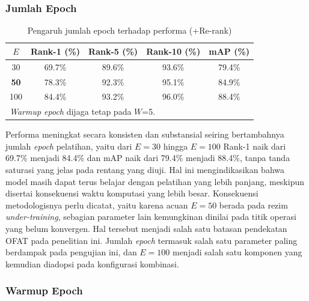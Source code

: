 \subsubsection{Jumlah Epoch}

\begin{table}[H]
    \centering
    \caption{Pengaruh jumlah epoch terhadap performa (+Re-rank)}
    \label{tab:var_epoch}
    \renewcommand{\arraystretch}{1.25}
    \begin{tabular}{ccccc}
        \hline
        $E$         & \textbf{Rank-1 (\%)} & \textbf{Rank-5 (\%)} & \textbf{Rank-10 (\%)} & \textbf{mAP (\%)} \\
        \hline
        30          & 69.7\%               & 89.6\%               & 93.6\%                & 79.4\%            \\
        \textbf{50} & 78.3\%               & 92.3\%               & 95.1\%                & 84.9\%            \\
        100         & 84.4\%               & 93.2\%               & 96.0\%                & 88.4\%            \\
        \hline
        \multicolumn{5}{l}{\footnotesize \textit{Warmup epoch} dijaga tetap pada $W$=5.}                      \\
    \end{tabular}
\end{table}

Performa meningkat secara konsisten dan substansial seiring bertambahnya jumlah \textit{epoch} pelatihan, yaitu dari $E=30$ hingga $E=100$ Rank-1 naik dari 69.7\% menjadi 84.4\% dan mAP naik dari 79.4\% menjadi 88.4\%, tanpa tanda saturasi yang jelas pada rentang yang diuji. Hal ini mengindikasikan bahwa model masih dapat terus belajar dengan pelatihan yang lebih panjang, meskipun disertai konsekuensi waktu komputasi yang lebih besar. Konsekuensi metodologisnya perlu dicatat, yaitu karena acuan $E=50$ berada pada rezim \textit{under-training}, sebagian parameter lain kemungkinan dinilai pada titik operasi yang belum konvergen. Hal tersebut menjadi salah satu batasan pendekatan OFAT pada penelitian ini. Jumlah \textit{epoch} termasuk salah satu parameter paling berdampak pada pengujian ini, dan $E=100$ menjadi salah satu komponen yang kemudian diadopsi pada konfigurasi kombinasi.

\subsubsection{Warmup Epoch}

